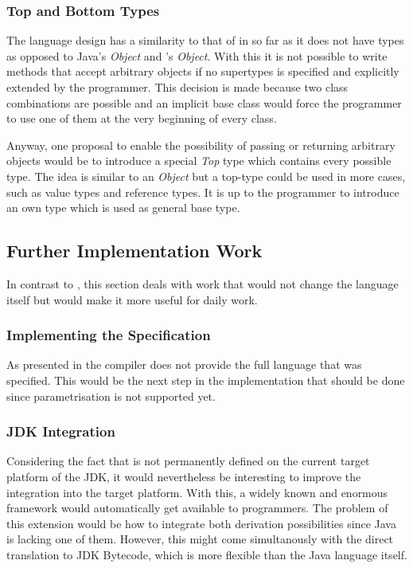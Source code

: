 \subsubsection{Top and Bottom Types}
The language design has a similarity to that of \cpp in so far as it
does not have types as opposed to Java's \emph{Object} and \cs's \emph
{Object}. With this it is not possible to write methods that accept
arbitrary objects if no supertypes is specified and explicitly extended
by the programmer. This decision is made because two class combinations
are possible and an implicit base class would force the programmer to
use one of them at the very beginning of every class.

Anyway, one proposal to enable the possibility of passing or returning
arbitrary objects would be to introduce a special \emph{Top} type which
contains every possible type. The idea is similar to an \emph{Object}
but a top-type could be used in more cases, such as value types and reference
types. It is up to the programmer to introduce an own type
which is used as general base type.


\subsection{Further Implementation Work}
In contrast to , this section deals with work that
would not change the language itself but would make it more useful
for daily work.

\subsubsection{Implementing the Specification}
As presented in  the compiler does not provide the
full language that was specified. This would be the next step in the
implementation that should be done since parametrisation is not supported
yet.

\subsubsection{JDK Integration}
Considering the fact that \ooplss is not permanently defined on the current
target platform of the JDK, it would nevertheless be interesting to
improve the integration into the target platform. With this, a widely
known and enormous framework would automatically get available to
\ooplss programmers. The problem of this extension would be how to integrate
both derivation possibilities since Java is lacking one of them. However,
this might come simultanously with the direct translation to JDK
Bytecode, which is more flexible than the Java language itself.

